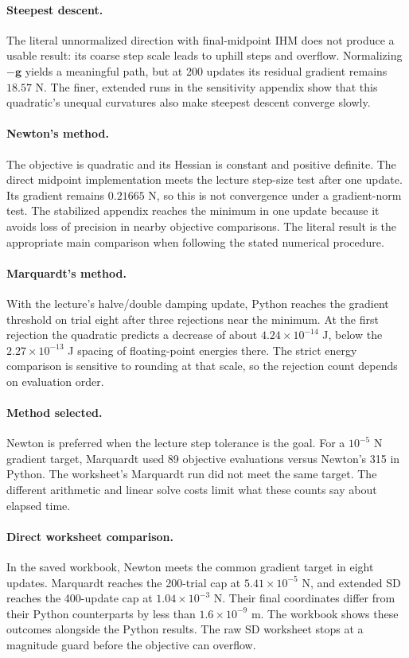 \documentclass[11pt,a4paper]{article}
\begin{document}
\paragraph{Steepest descent.}
The literal unnormalized direction with final-midpoint IHM does not produce
a usable result: its coarse step scale leads to uphill steps and overflow.
Normalizing $-\bm g$ yields a meaningful path, but at 200 updates its
residual gradient remains $18.57$ N. The finer, extended runs in the
sensitivity appendix show that this quadratic's unequal curvatures also
make steepest descent converge slowly.

\paragraph{Newton's method.}
The objective is quadratic and its Hessian is constant and positive definite.
The direct midpoint implementation meets the lecture step-size test after one update. Its gradient remains $0.21665$ N, so this is not convergence under a gradient-norm test. The stabilized
appendix reaches the minimum in one update because it avoids loss of
precision in nearby objective comparisons. The literal result is the
appropriate main comparison when following the stated numerical procedure.

\paragraph{Marquardt's method.}
With the lecture's halve/double damping update, Python reaches the gradient
threshold on trial eight after three rejections near the minimum.
At the first rejection the quadratic predicts a decrease of about
$4.24\times10^{-14}$ J, below the $2.27\times10^{-13}$ J spacing of
floating-point energies there. The strict energy comparison is sensitive
to rounding at that scale, so the rejection count depends on evaluation order.

\paragraph{Method selected.}
Newton is preferred when the lecture step tolerance is the goal. For a
$10^{-5}$ N gradient target, Marquardt used 89 objective evaluations versus Newton's 315 in Python.
The worksheet's Marquardt run did not meet the same target. The different arithmetic
and linear solve costs limit what these counts say about elapsed time.

\paragraph{Direct worksheet comparison.}
In the saved workbook, Newton meets the common gradient target in eight
updates. Marquardt reaches the 200-trial cap at $5.41\times10^{-5}$ N,
and extended SD reaches the 400-update cap at $1.04\times10^{-3}$ N.
Their final coordinates differ from their Python counterparts by less
than $1.6\times10^{-9}$ m. The workbook shows these outcomes alongside
the Python results. The raw SD worksheet stops at a magnitude guard
before the objective can overflow.
\end{document}
